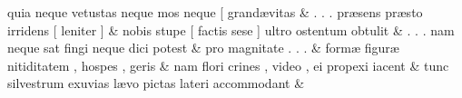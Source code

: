 \documentclass[12pt,onecolumn,twoside,a4paper]{memoir}
\begin{document}
\begin{pairs}
\begin{Leftside}
                     quia
                              neque
                              vetustas
                              neque
                              mos
                              neque
                              [
                              grandævitas \&
                         \stanza {}.
                              .
                              .
                              præsens
                              præsto
                              irridens
                              [
                              leniter
                              ] & 
                     nobis
                              stupe
                              [
                              factis
                              sese
                              ]
                              ultro
                              ostentum
                              obtulit \&
                         \stanza {}.
                              .
                              .
                              nam
                              neque
                              sat
                              fingi
                              neque
                              dici
                              potest & 
                     pro
                              magnitate
                              .
                              .
                              . \&
                         \stanza {}
                     formæ
                              figuræ
                              nitiditatem
                              ,
                              hospes
                              ,
                              geris \&
                         \stanza {}
                     nam
                              flori
                              crines
                              ,
                              video
                              ,
                              ei
                              propexi
                              iacent \&
                         \stanza {}
                     tunc
                              silvestrum
                              exuvias
                              lævo
                              pictas
                              lateri
                              accommodant \&
                         \stanza {}
                     

\end{Leftside}
\end{pairs}
\end{document}
